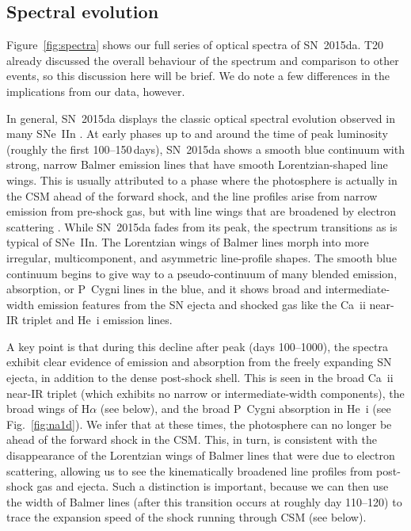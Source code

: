 \documentclass[fleqn,usenatbib,useAMS]{mnras}
\begin{document}
\subsection{Spectral evolution}

Figure~\ref{fig:spectra} shows our full series of optical spectra of
SN~2015da.  T20 already discussed the overall behaviour of the spectrum
and comparison to other events, so this discussion here will be brief.
We do note a few differences in the implications from our data, however.

In general, SN~2015da displays the classic optical spectral evolution
observed in many SNe~IIn \citep[see][]{smith08tf}.  At early phases up to
and around the time of peak luminosity (roughly the first 100--150\,days), 
SN~2015da shows a smooth blue continuum with strong, narrow
Balmer emission lines that have smooth Lorentzian-shaped line wings.
This is usually attributed to a phase where the photosphere is
actually in the CSM ahead of the forward shock, and the line profiles
arise from narrow emission from pre-shock gas, but with line wings that are broadened
by electron scattering \citep{chugai77,smith08tf}.  While SN~2015da
fades from its peak, the spectrum transitions as is typical of
SNe~IIn.  The Lorentzian wings of Balmer lines morph into more
irregular, multicomponent, and asymmetric line-profile shapes.  The
smooth blue continuum begins to give way to a pseudo-continuum of many
blended emission, absorption, or P~Cygni lines in the blue, and it
shows broad and intermediate-width emission features from the SN
ejecta and shocked gas like the Ca~{\sc ii} near-IR triplet and He~{\sc i}
emission lines.

A key point is that during this decline after peak (days 100--1000),
the spectra exhibit clear evidence of emission and absorption from the
freely expanding SN ejecta, in addition to the dense post-shock shell.
This is seen in the broad Ca~{\sc ii} near-IR triplet (which exhibits no narrow or intermediate-width components), the broad wings of
H$\alpha$ (see below), and the broad P~Cygni absorption in He~{\sc i}
(see Fig.~\ref{fig:na1d}).  We infer that at these times, the
photosphere can no longer be ahead of the forward shock in the CSM.
This, in turn, is consistent with the disappearance of the Lorentzian
wings of Balmer lines that were due to electron scattering, allowing
us to see the kinematically broadened line profiles from post-shock
gas and ejecta.  Such a distinction is important, because we can then
use the width of Balmer lines (after this transition occurs at roughly
day 110--120) to trace the expansion speed of the shock running through CSM
(see below).
\end{document}

